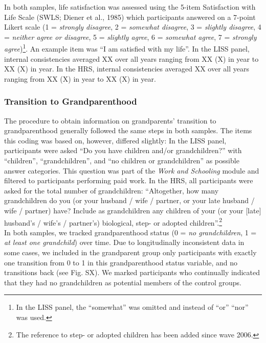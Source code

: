 \documentclass[
  english,
  man, noextraspace]{apa7}
\begin{document}
In both samples, life satisfaction was assessed using the 5-item Satisfaction with Life Scale (SWLS; Diener et al., 1985) which participants answered on a 7-point Likert scale (1 = \emph{strongly disagree}, 2 = \emph{somewhat disagree}, 3 = \emph{slightly disagree}, 4 = \emph{neither agree or disagree}, 5 = \emph{slightly agree}, 6 = \emph{somewhat agree}, 7 = \emph{strongly agree})\footnote{In the LISS panel, the \enquote{somewhat} was omitted and instead of \enquote{or} \enquote{nor} was used.}. An example item was \enquote{I am satisfied with my life}. In the LISS panel, internal consistencies averaged XX over all years ranging from XX (X) in year to XX (X) in year. In the HRS, internal consistencies averaged XX over all years ranging from XX (X) in year to XX (X) in year.

\hypertarget{transition-to-grandparenthood}{%
\subsubsection{Transition to Grandparenthood}\label{transition-to-grandparenthood}}

The procedure to obtain information on grandparents' transition to grandparenthood generally followed the same steps in both samples. The items this coding was based on, however, differed slightly: In the LISS panel, participants were asked \enquote{Do you have children and/or grandchildren?} with \enquote{children}, \enquote{grandchildren}, and \enquote{no children or grandchildren} as possible answer categories. This question was part of the \emph{Work and Schooling} module and filtered to participants performing paid work. In the HRS, all participants were asked for the total number of grandchildren: \enquote{Altogether, how many grandchildren do you (or your husband / wife / partner, or your late husband / wife / partner) have? Include as grandchildren any children of your (or your {[}late{]} husband's / wife's / partner's) biological, step- or adopted children}.\footnote{The reference to step- or adopted children has been added since wave 2006.}\\
In both samples, we tracked grandparenthood status (0 = \emph{no grandchildren}, 1 = \emph{at least one grandchild}) over time. Due to longitudinally inconsistent data in some cases, we included in the grandparent group only participants with exactly one transition from 0 to 1 in this grandparenthood status variable, and no transitions back (see Fig. SX). We marked participants who continually indicated that they had no grandchildren as potential members of the control groups.
\end{document}
